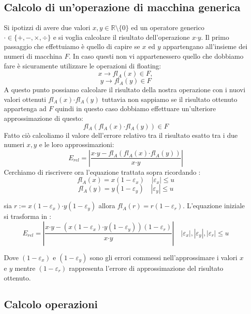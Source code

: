 \documentclass[12pt, a4paper]{book}
\theoremstyle{definition}
\begin{document}
\subsection{ Calcolo di un'operazione di macchina generica}
\begin{flushleft}
Si ipotizzi di avere due valori $x,y \in \mathbb{R} \setminus \{ 0 \}$ ed un operatore generico $\boldsymbol{\cdot} \in \{ + ,  -,  \times,  \div\}$ e si voglia calcolare il risultato dell'operazione $x \boldsymbol{\cdot}  y$.
Il primo passaggio che effettuiamo è quello di capire se $x$ ed $y$ appartengano all'insieme dei numeri di macchina $F$. 
In caso questi non vi appartenessero quello che dobbiamo fare è sicuramente utilizzare le operazioni di floating: 
\[ x \longrightarrow fl_{A}(x) \in F, \]
\[y \longrightarrow fl_{A}(y) \in F \]
A questo punto possiamo calcolare il risultato della nostra operazione con i nuovi valori ottenuti $fl_{A}(x) \boldsymbol{\cdot}  fl_{A}(y)$ tuttavia non sappiamo se il risultato ottenuto appartenga ad $F$ quindi in questo caso dobbiamo effettuare un'ulteriore approssimazione di questo: 
\[ 
	fl_{A}(fl_{A}(x) \boldsymbol{\cdot}  fl_{A}(y)) \in F 
\]
Fatto ciò calcoliamo il valore dell'errore relativo tra il risultato esatto tra i due numeri $x,y$ e le loro approssimazioni: 
 \[
 	E_{rel} =  \displaystyle\left\lvert \frac{x \boldsymbol{\cdot} y - fl_{A}(fl_{A}(x) \boldsymbol{\cdot}  fl_{A}(y)) }{x \boldsymbol{\cdot} y} \right\rvert
 \]
Cerchiamo di riscrivere ora l'equazione trattata sopra ricordando : 
\[ fl_{A}(x) = x(1 - \varepsilon_{x}) \quad |\varepsilon_{x}| \leq u \]
\[ fl_{A}(y) = y(1 - \varepsilon_{y}) \quad |\varepsilon_{y}| \leq u \]

sia $r :=  x(1 - \varepsilon_{x})\boldsymbol{\cdot}  y(1 - \varepsilon_{y}) $ allora $fl_{A}(r) = r(1-\varepsilon_{r})$.  L'equazione iniziale si trasforma in :
\[E_{rel} =  \displaystyle\left\lvert \frac{x \boldsymbol{\cdot} y - (x(1 - \varepsilon_{x})\boldsymbol{\cdot}  y(1 - \varepsilon_{y}))(1-\varepsilon_{r})}{x \boldsymbol{\cdot} y} \right\rvert \quad |\varepsilon_{x}|, |\varepsilon_{y}|, |\varepsilon_{r}| \leq u\]

Dove $(1-\varepsilon_{x})$ e $(1 - \varepsilon_{y})$ sono gli errori commessi nell'approssimare i valori $x$ e $y$ mentre $(1 - \varepsilon_{r})$ rappresenta l'errore di approssimazione del risultato ottenuto.
\end{flushleft}

\subsection{Calcolo operazioni}
\end{document}
